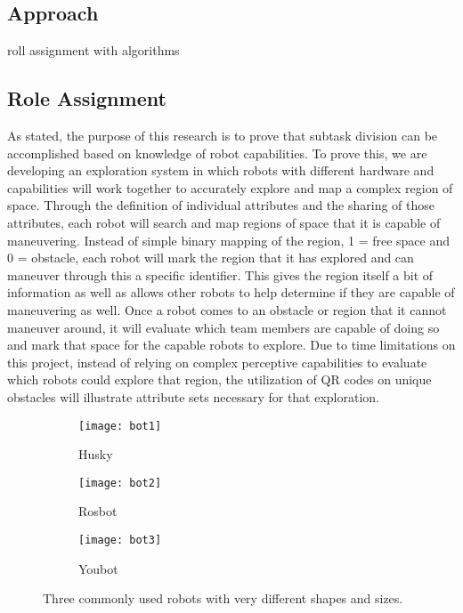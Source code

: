 \subsection{Approach}


roll assignment with algorithms


\subsection{Role Assignment}

As stated, the purpose of this research is to prove that subtask division can
be accomplished based on knowledge of robot capabilities. To prove this, we are
developing an exploration system in which robots with different hardware and
capabilities will work together to accurately explore and map a complex region
of space. Through the definition of individual attributes and the sharing of
those attributes, each robot will search and map regions of space that it is
capable of maneuvering. Instead of simple binary mapping of the region, 1 =
free space and 0 = obstacle, each robot will mark the region that it has
explored and can maneuver through this a specific identifier. This gives the
region itself a bit of information as well as allows other robots to help
determine if they are capable of maneuvering as well.
Once a robot comes to an obstacle or region that it cannot maneuver around,
it will evaluate which team members are capable of doing so and mark that space
for the capable robots to explore. Due to time limitations on this project,
instead of relying on complex perceptive capabilities to evaluate which robots
could explore that region, the utilization of QR codes on unique obstacles will
illustrate attribute sets necessary for that exploration.

\begin{figure}
    \centering
    \begin{subfigure}[b]{0.15\textwidth}
        \texttt{[image: bot1]}
        \caption{Husky}
        \label{fig:bot1}
    \end{subfigure}
    \begin{subfigure}[b]{0.15\textwidth}
        \texttt{[image: bot2]}
        \caption{Rosbot}
        \label{fig:bot2}
    \end{subfigure}
    \begin{subfigure}[b]{0.15\textwidth}
        \texttt{[image: bot3]}
        \caption{Youbot}
        \label{fig:bot3}
    \end{subfigure}
    \caption{Three commonly used robots with very different shapes and sizes.}\label{fig:bots}
\end{figure}


